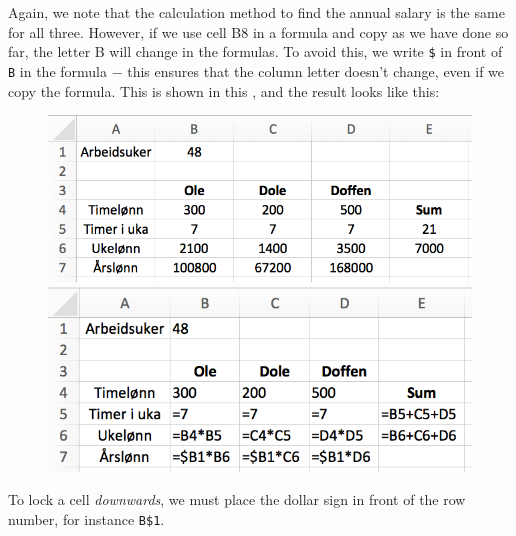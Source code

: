 Again, we note that the calculation method to find the annual salary is the same for all three. However, if we use cell B8 in a formula and copy as we have done so far, the letter B will change in the formulas. To avoid this, we write {\tt \$} in front of {\tt B} in the formula $ - $ this ensures that the column letter doesn't change, even if we copy the formula. This is shown in this , and the result looks like this:
\begin{figure}[H]
	\centering
	\includegraphics[scale=0.3]{figs/ex12}\\[5pt]
	\includegraphics[scale=0.3]{figs/ex13}
\end{figure}
To lock a cell \textsl{downwards}, we must place the dollar sign in front of the row number, for instance {\tt{B\$1}}.
